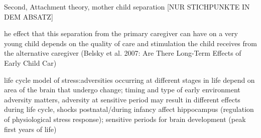 \documentclass[11pt, a4paper,draft]{article} %
\begin{document}
Second, Attachment theory, mother child separation [NUR STICHPUNKTE IN DEM ABSATZ]

he effect that this separation from the primary caregiver can have on a very young child depends on the quality
of care and stimulation the child receives from the alternative caregiver
(Belsky et al. 2007: Are There Long-Term Effects of Early Child Car)


\cite{raikkonen2012early} life cycle model of stress:adversities occurring at different stages in life depend on area of the brain that undergo change; timing and type of early environment adversity matters, adversity at sensitive period may result in different effects during life cycle, shocks postnatal/during infancy affect hippocampus (regulation of physiological stress response); sensitive periods for brain development (peak first years of life)
\newline
\end{document}
